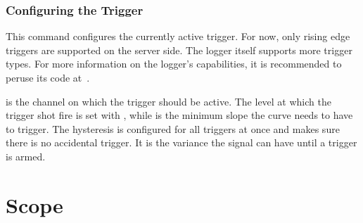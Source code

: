 
\subsection{Configuring the Trigger} %
\label{subsec:devguide:server:configuring_trigger}

This command  configures the currently  active trigger.  For now,  only rising
edge triggers  are supported  on the server  side. The logger  itself supports
more trigger types. For  more information on the logger's  capabilities, it is
recommended to peruse its code at~\cite{pita:github:huesser:zynq-logger}.

 is the channel on which the trigger should be active. The level
at which the trigger shot fire is set with , while  is
the  minimum slope  the  curve needs  to have  to  trigger. The hysteresis  is
configured for  all triggers  at once  and makes sure  there is  no accidental
trigger. It is the variance the signal can have until a trigger is armed.


%
%
\chapter{Scope} %
\label{ch:devguide:scope}

